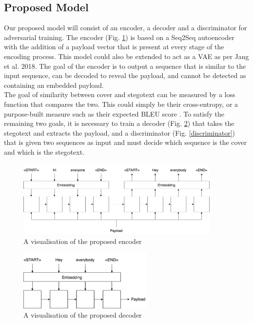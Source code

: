 \documentclass[11pt,a4paper]{article}
\begin{document}
  \subsection *{Proposed Model}
    Our proposed model will consist of an encoder, a decoder and a discriminator for adversarial training.
    The encoder (Fig. \ref{encoder}) is based on a Seq2Seq autoencoder with the addition of a payload vector that is present at every stage of the encoding process. This model could also be extended to act as a VAE as per Jang et al. 2018. The goal of the encoder is to output a sequence that is similar to the input sequence, can be decoded to reveal the payload, and cannot be detected as containing an embedded payload. \\
    \indent The goal of similarity between cover and stegotext can be measured by a loss function that compares the two. This could simply be their cross-entropy, or a purpose-built measure such as their expected BLEU score \cite{bleu}. To satisfy the remaining two goals, it is necessary to train a decoder  (Fig. \ref{decoder}) that takes the stegotext and extracts the payload, and a discriminator (Fig. \ref{discriminator})  that is given two sequences as input and must decide which sequence is the cover and which is the stegotext. 
    \begin{figure}[htp]
      \centering
      \includegraphics[width=0.9\textwidth]{encoder.png}
      \caption{A visualisation of the proposed encoder}
      \label{encoder}
    \end{figure}
    \begin{figure}[htp]{}
      \centering
      \includegraphics[width=0.6\textwidth]{decoder.png}
      \caption{A visualisation of the proposed decoder}
      \label{decoder}
    \end{figure}
\end{document}
